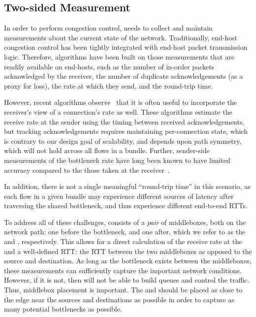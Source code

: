 \subsection{Two-sided Measurement}\label{s:design:twosided}
In order to perform congestion control, \name needs to collect and maintain measurements about the current state of the network.
Traditionally, end-host congestion control has been tightly integrated with end-host packet transmission logic. Therefore, algorithms have been built on those measurements that are readily available on end-hosts, such as the number of in-order packets acknowledged by the receiver, the number of duplicate acknowledgements (as a proxy for loss), the rate at which they send, and the round-trip time.

However, recent algorithms observe~\cite{bbr, sprout, remy, nimbus} that it is often useful to incorporate the receiver's view of a connection's rate as well. These algorithms estimate the receive rate at the sender using the timing between received acknowledgements, but tracking acknowledgements requires maintaining per-connection state, which is contrary to our design goal of scalability, and depends upon path symmetry, which will not hold across all flows in a bundle. Further, sender-side measurements of the bottleneck rate have long been known to have limited accuracy compared to the those taken at the receiver~\cite{packet-dynamics, path-properties}.

In addition, there is not a single meaningful ``round-trip time'' in this scenario, as each flow in a given bundle may experience different sources of latency after traversing the shared bottleneck, and thus experience different end-to-end RTTs. 

To address all of these challenges, \name consists of a \emph{pair} of middleboxes, both on the network path: one before the bottleneck, and one after, which we refer to as the \textit{\inbox} and \textit{\outbox}, respectively. This allows for a direct calculation of the receive rate at the \outbox and a well-defined RTT: the RTT between the two middleboxes as opposed to the source and destination. As long as the bottleneck exists between the middleboxes, these measurements can sufficiently capture the important network conditions. However, if it is not, then \name will not be able to build queues and control the traffic. Thus, middlebox placement is important. The \inboxx and \outbox should be placed as close to the edge near the sources and destinations as possible in order to capture as many potential bottlenecks as possible.

